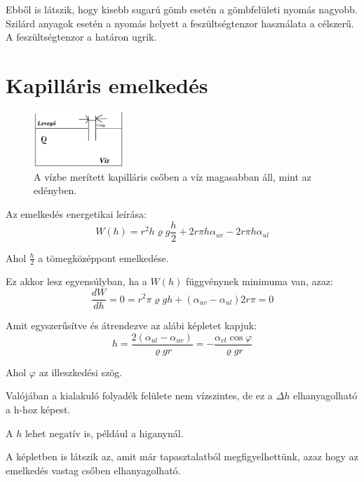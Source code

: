 \documentclass[12pt,a4paper]{scrartcl}
\begin{document}
\noindent
Ebből is látszik, hogy kisebb sugarú gömb esetén a gömbfelületi nyomás nagyobb. Szilárd anyagok esetén a nyomás helyett a feszültségtenzor használata a célszerű. A feszültségtenzor a határon ugrik.

\part*{Kapilláris emelkedés }

\begin{figure}[htbp]
	\begin{center}
		\includegraphics[width=0.3\textwidth]{tetel74.png}
		\caption{A vízbe merített kapilláris csőben a víz magasabban áll, mint az edényben.}
	\end{center}
\end{figure}

\noindent
Az emelkedés energetikai leírása: $$ W(h)=r^{2}h\varrho g \frac{h}{2}+2r\pi h\alpha_{uv}-2r\pi h\alpha_{ul}$$

\noindent
Ahol $\frac{h}{2}$ a tömegközéppont emelkedése.

\noindent
Ez akkor lesz egyensúlyban, ha a $W(h)$ függvénynek minimuma van, azaz: $$\frac{dW}{dh}=0=r^2\pi\varrho gh+(\alpha_{uv}-\alpha_{ul})2r\pi=0 $$ 

\noindent
Amit egyszerűsítve és átrendezve az alábi képletet kapjuk: $$h=\frac{2(\alpha_{ul}-\alpha_{uv})}{\varrho gr}=-\frac{\alpha_{vl}\cos{\varphi}}{\varrho gr}$$

\noindent
Ahol $\varphi$ az illeszkedési szög.

\noindent
Valójában a kialakuló folyadék felülete nem vízszintes, de ez a $\Delta h$ elhanyagolható a h-hoz képest.

\noindent
A $h$ lehet negatív is, például a higanynál.

\noindent
A képletben is látszik az, amit már tapasztalatból megfigyelhettünk, azaz hogy az emelkedés vastag csőben elhanyagolható.
\end{document}
